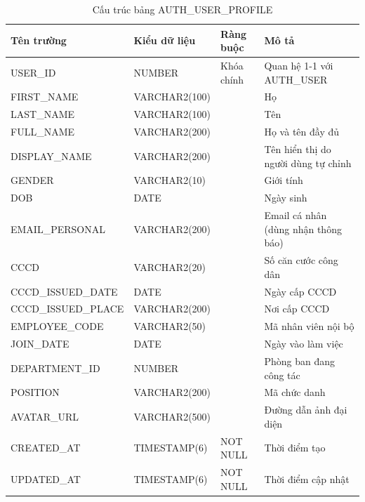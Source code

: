 \documentclass[../DoAn.tex]{subfiles}
\begin{document}
\begin{table}[H]
\centering
\caption{Cấu trúc bảng AUTH\_USER\_PROFILE}
\label{tab:auth-user-profile}
\footnotesize
\begin{tabular}{|p{3.0cm}|p{2.3cm}|p{2.7cm}|p{4.5cm}|}
\hline
\textbf{Tên trường} & \textbf{Kiểu dữ liệu} & \textbf{Ràng buộc} & \textbf{Mô tả} \\ \hline
USER\_ID & NUMBER & Khóa chính & Quan hệ 1-1 với AUTH\_USER \\ \hline
FIRST\_NAME & VARCHAR2(100) & & Họ \\ \hline
LAST\_NAME & VARCHAR2(100) & & Tên \\ \hline
FULL\_NAME & VARCHAR2(200) & & Họ và tên đầy đủ \\ \hline
DISPLAY\_NAME & VARCHAR2(200) & & Tên hiển thị do người dùng tự chỉnh \\ \hline
GENDER & VARCHAR2(10) & & Giới tính \\ \hline
DOB & DATE & & Ngày sinh \\ \hline
EMAIL\_PERSONAL & VARCHAR2(200) & & Email cá nhân (dùng nhận thông báo) \\ \hline
CCCD & VARCHAR2(20) & & Số căn cước công dân \\ \hline
CCCD\_ISSUED\_DATE & DATE & & Ngày cấp CCCD \\ \hline
CCCD\_ISSUED\_PLACE & VARCHAR2(200) & & Nơi cấp CCCD \\ \hline
EMPLOYEE\_CODE & VARCHAR2(50) & & Mã nhân viên nội bộ \\ \hline
JOIN\_DATE & DATE & & Ngày vào làm việc \\ \hline
DEPARTMENT\_ID & NUMBER & & Phòng ban đang công tác \\ \hline
POSITION & VARCHAR2(200) & & Mã chức danh \\ \hline
AVATAR\_URL & VARCHAR2(500) & & Đường dẫn ảnh đại diện \\ \hline
CREATED\_AT & TIMESTAMP(6) & NOT NULL & Thời điểm tạo \\ \hline
UPDATED\_AT & TIMESTAMP(6) & NOT NULL & Thời điểm cập nhật \\ \hline
\end{tabular}
\end{table}
\end{document}
